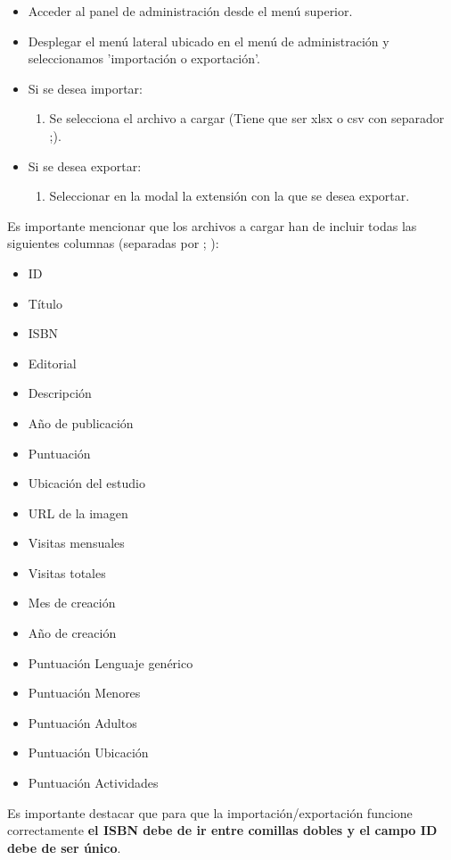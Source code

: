 \begin{itemize}
    \item Acceder al panel de administración desde el menú superior.
    \item Desplegar el menú lateral ubicado en el menú de administración y seleccionamos 'importación o exportación'.
    \item Si se desea importar:
    \begin{enumerate}
        \item Se selecciona el archivo a cargar (Tiene que ser xlsx o csv con separador ;).
    \end{enumerate}
    \item Si se desea exportar:
    \begin{enumerate}
        \item Seleccionar en la modal la extensión con la que se desea exportar.
    \end{enumerate}
\end{itemize}

Es importante mencionar que los archivos a cargar han de incluir todas las siguientes columnas (separadas por ; ):
\begin{itemize}
    \item ID
    \item Título
    \item ISBN
    \item Editorial
    \item Descripción
    \item Año de publicación
    \item Puntuación
    \item Ubicación del estudio
    \item URL de la imagen
    \item Visitas mensuales
    \item Visitas totales
    \item Mes de creación
    \item Año de creación
    \item Puntuación Lenguaje genérico
    \item Puntuación Menores
    \item Puntuación Adultos
    \item Puntuación Ubicación
    \item Puntuación Actividades
\end{itemize}

Es importante destacar que para que la importación/exportación funcione correctamente \textbf{el ISBN debe de ir entre comillas dobles y el campo ID debe de ser único}.

